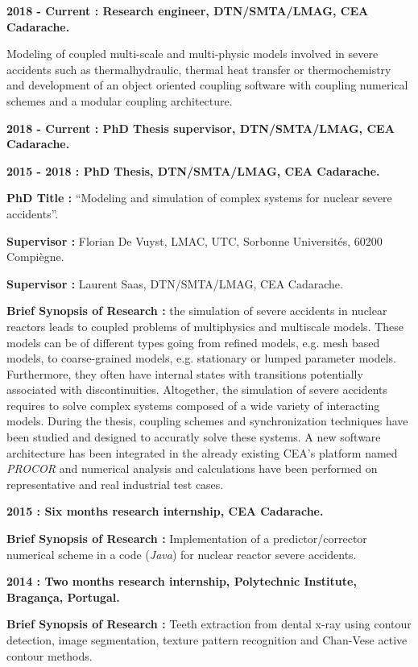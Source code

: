 \documentclass{article}
\renewenvironment{itemize}{
  \begin{list}{}{
      \setlength{\leftmargin}{1.5em}
      \setlength{\itemsep}{0.25em}
      \setlength{\parskip}{0pt}
      \setlength{\parsep}{0.25em}
    }
}{
  \end{list}
}
\begin{document}
	\begin{itemize}
		\item \textbf{2018 - Current : Research engineer, DTN/SMTA/LMAG, CEA Cadarache.}
			\begin{itemize}
				\item Modeling of coupled multi-scale and multi-physic models involved in severe accidents such as thermalhydraulic, thermal heat transfer or thermochemistry and development of an object oriented coupling software with coupling numerical schemes and a modular coupling architecture.
			\end{itemize}
		\item \textbf{2018 - Current : PhD Thesis supervisor, DTN/SMTA/LMAG, CEA Cadarache.}
		\item \textbf{2015 - 2018 : PhD Thesis, DTN/SMTA/LMAG, CEA Cadarache.}
			\begin{itemize}
				\item \textbf{PhD Title :} ``Modeling and simulation of complex systems for nuclear severe accidents''.
				\item \textbf{Supervisor :} Florian De Vuyst, LMAC, UTC, Sorbonne Universités, 60200 Compiègne.
				\item \textbf{Supervisor :} Laurent Saas, DTN/SMTA/LMAG, CEA Cadarache.
				\item \textbf{Brief Synopsis of Research :} the simulation of severe accidents in nuclear reactors leads to coupled problems of multiphysics and multiscale models. These models can be of different types going from refined models, e.g. mesh based models, to coarse-grained models, e.g. stationary or lumped parameter models. Furthermore, they often have internal states with transitions potentially associated with discontinuities. Altogether, the simulation of severe accidents requires to solve complex systems composed of a wide variety of interacting models. During the thesis, coupling schemes and synchronization techniques have been studied and designed to accuratly solve these systems. A new software architecture has been integrated in the already existing CEA's platform named \textit{PROCOR} and numerical analysis and calculations have been performed on representative and real industrial test cases.
			\end{itemize}
	\item \textbf{2015 : Six months research internship, CEA Cadarache.}
		\begin{itemize}
			\item \textbf{Brief Synopsis of Research :} Implementation of a predictor/corrector numerical scheme in a code (\textit{Java}) for nuclear reactor severe accidents.
		\end{itemize}
	\item \textbf{2014 : Two months research internship, Polytechnic Institute, Bragança, Portugal.}
		\begin{itemize}
			\item \textbf{Brief Synopsis of Research :} Teeth extraction from dental x-ray using contour detection, image segmentation, texture pattern recognition and Chan-Vese active contour methods.
		\end{itemize}
\end{itemize}  
\end{document}
